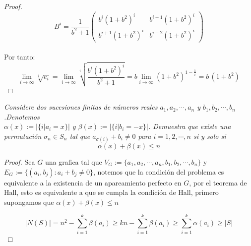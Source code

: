 \documentclass[11pt]{article}
\begin{document}
\begin{proof}
\begin{equation*}
        B^i=\frac{1}{b^2+1}\begin{pmatrix}
            b^i(1+b^2)^i&b^{i+1}(1+b^2)^i\\
            b^{i+1}(1+b^2)^i&b^{i+2}(1+b^2)^i
        \end{pmatrix}
    \end{equation*}\,\\
    Por tanto:\,\\
    \begin{equation*}
        \lim_{i\rightarrow \infty}\sqrt[i]{e_i}=\lim_{i\rightarrow \infty}\sqrt[i]{\frac{b^i(1+b^2)^i}{b^2+1}}=b\lim_{i\rightarrow \infty}(1+b^2)^{1-\frac{1}{i}}=b\,(1+b^2)
    \end{equation*}
\end{proof}
\begin{tcolorbox}[
	title = \textcolor{black}{\textbf{\textcolor{white}{Problema 5\,(Teor\'ia de Gr\'aficas)}}},
	]
\textit{Considere dos sucesiones finitas de n\'umeros reales $a_1,a_2,\cdots,a_n$ y $b_1,b_2,\cdots,b_n$.Denotemos 
\\$\alpha(x):=|\{i|a_i=x\}|$ y $\beta(x):=|\{i|b_i=-x\}|$. Demuestra que existe una permutaci\'on $\sigma_n\in S_n$ tal que $a_{\sigma(i)}+b_i\neq 0$ para  $i=1,2,\cdots,n$ si y solo si 
\begin{equation*}
    \alpha(x)+\beta(x)\leq n
\end{equation*}}
\end{tcolorbox}
\begin{proof}
    Sea $G$ una grafica tal que $V_G:=\{a_1,a_2,\cdots,a_n,b_1,b_2,\cdots,b_n\}$ y $E_G:=\{(a_i,b_j):a_i+b_j\neq 0\}$, notemos que la condici\'on del problema es equivalente a la existencia de
    un apareamiento perfecto en $G$, por el teorema de Hall, esto es equivalente a que se cumpla la condici\'on de Hall, primero supongamos que $\alpha(x)+\beta(x)\leq n$
    
    \begin{equation*}
        |N(S)|=n^2-\sum_{i=1}^{k}\beta(a_i)\geq kn-\sum_{i=1}^{k}\beta(a_i)\geq\sum_{i=1}^{k}\alpha(a_i)\geq |S|
    \end{equation*}
\end{proof}
\end{document}
